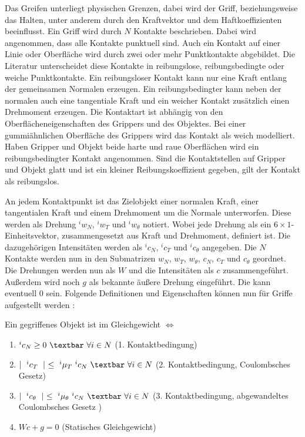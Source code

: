 Das Greifen unterliegt physischen Grenzen, dabei wird der Griff, beziehungsweise das Halten, unter anderem durch den Kraftvektor und dem Haftkoeffizienten beeinflusst. Ein Griff wird durch $N$ Kontakte beschrieben. Dabei wird angenommen, dass alle Kontakte punktuell sind. Auch ein Kontakt auf einer Linie oder Oberfläche wird durch zwei oder mehr Punktkontakte abgebildet. Die Literatur unterscheidet diese Kontakte in reibungslose, reibungsbedingte oder weiche Punktkontakte.\cite{salisbury1983kinematic} Ein reibungsloser Kontakt kann nur eine Kraft entlang der gemeinsamen Normalen erzeugen. Ein reibungsbedingter kann neben der normalen auch eine tangentiale Kraft und ein weicher Kontakt zusätzlich einen Drehmoment erzeugen. Die Kontaktart ist abhängig von den Oberflächeneigenschaften des Grippers und des Objektes. Bei einer gummiähnlichen Oberfläche des Grippers wird das Kontakt als weich modelliert. Haben Gripper und Objekt beide harte und raue Oberflächen wird ein reibungsbedingter Kontakt angenommen. Sind die Kontaktstellen auf Gripper und Objekt glatt und ist ein kleiner Reibungskoeffizient gegeben, gilt der Kontakt als reibungslos.\cite{bicchi2000robotic}

An jedem Kontaktpunkt ist das Zielobjekt einer normalen Kraft, einer tangentialen Kraft und einem Drehmoment um die Normale unterworfen. Diese werden als Drehung $^iw_N$, $^iw_T$ und $^iw_\theta$ notiert. Wobei jede Drehung als ein $6 \times 1$-Einheitsvektor, zusammengesetzt aus Kraft und Drehmoment, definiert ist. Die dazugehörigen Intensitäten werden als $^ic_N$, $^ic_T$ und $^ic_\theta$ angegeben. Die $N$ Kontakte werden nun in den Submatrizen $w_N$, $w_T$, $w_\theta$, $c_N$, $c_T$ und $c_\theta$ geordnet. Die Drehungen werden nun als $W$ und die Intensitäten als $c$ zusammengeführt. Außerdem wird noch $g$ als bekannte äußere Drehung eingeführt. Die kann eventuell 0 sein. Folgende Definitionen und Eigenschaften können nun für Griffe aufgestellt werden \cite{salisbury1983kinematic}:

Ein gegriffenes Objekt ist im Gleichgewicht $\Leftrightarrow$ 

\begin{enumerate}
	\item $^ic_N \geq 0 ~\textbar ~\forall i \in N $ (1. Kontaktbedingung)
	\item $\mid ~^ic_T ~\mid~ \leq ~^i\mu_T ~^ic_N ~\textbar~ \forall i \in N $ (2. Kontaktbedingung, Coulombsches Gesetz)
	\item $\mid ~^ic_\theta ~\mid ~\leq ~^i\mu_\theta ~^ic_N ~\textbar~ \forall i \in N $ (3. Kontaktbedingung, abgewandeltes Coulombsches Gesetz \cite{mason1985robot})
	\item $Wc+g=0$ (Statisches Gleichgewicht)
\end{enumerate}




